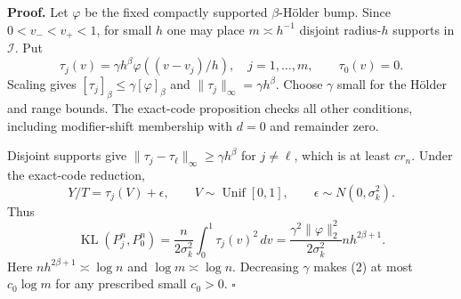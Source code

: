 \textbf{Proof.}
Let \(\varphi\) be the fixed compactly supported \(\beta\)-H\"older bump. Since \(0<v_-<v_+<1\), for small \(h\) one may place \(m\asymp h^{-1}\) disjoint radius-\(h\) supports in \(\mathcal I\). Put
\[
 \tau_j(v)=\gamma h^\beta\varphi((v-v_j)/h),\quad j=1,\ldots,m,
 \qquad \tau_0(v)=0. \tag{1}
\]
Scaling gives \([\tau_j]_\beta\le\gamma[\varphi]_\beta\) and \(\|\tau_j\|_\infty=\gamma h^\beta\). Choose \(\gamma\) small for the H\"older and range bounds. The exact-code proposition checks all other conditions, including modifier-shift membership with \(d=0\) and remainder zero.

Disjoint supports give \(\|\tau_j-\tau_\ell\|_\infty\ge\gamma h^\beta\) for \(j\ne\ell\), which is at least \(cr_n\). Under the exact-code reduction,
\[
 Y/T=\tau_j(V)+\epsilon,\qquad V\sim\operatorname{Unif}[0,1],
 \qquad \epsilon\sim N(0,\sigma_k^2).
\]
Thus
\[
 \operatorname{KL}(P_j^n,P_0^n)
 =\frac{n}{2\sigma_k^2}\int_0^1\tau_j(v)^2\,dv
 =\frac{\gamma^2\|\varphi\|_2^2}{2\sigma_k^2}nh^{2\beta+1}. \tag{2}
\]
Here \(nh^{2\beta+1}\asymp\log n\) and \(\log m\asymp\log n\). Decreasing \(\gamma\) makes (2) at most \(c_0\log m\) for any prescribed small \(c_0>0\). \(\square\)